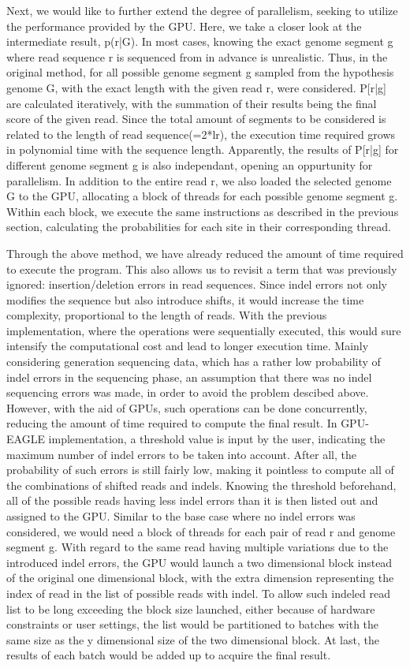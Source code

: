 \documentclass{PHlab-thesis}
\begin{document}
Next, we would like to further extend the degree of parallelism, seeking to utilize the performance provided by the GPU. Here, we take a closer look at the intermediate result, p(r|G). In most cases, knowing the exact genome segment g where read sequence r is sequenced from in advance is unrealistic. Thus, in the original method, for all possible genome segment g sampled from the hypothesis genome G, with the exact length with the given read r, were considered. P[r|g] are calculated iteratively, with the summation of their results being the final score of the given read. Since the total amount of segments to be considered is related to the length of read sequence(=2*lr), the execution time required grows in polynomial time with the sequence length. Apparently, the results of P[r|g] for different genome segment g is also independant, opening an oppurtunity for parallelism. In addition to the entire read r, we also loaded the selected genome G to the GPU, allocating a block of threads for each possible genome segment g. Within each block, we execute the same instructions as described in the previous section, calculating the probabilities for each site in their corresponding thread.

Through the above method, we have already reduced the amount of time required to execute the program. This also allows us to revisit a term that was previously ignored: insertion/deletion errors in read sequences. Since indel errors not only modifies the sequence but also introduce shifts, it would increase the time complexity, proportional to the length of reads. With the previous implementation, where the operations were sequentially executed, this would sure intensify the computational cost and lead to longer execution time. Mainly considering generation sequencing data, which has a rather low probability of indel errors in the sequencing phase, an assumption that there was no indel sequencing errors was made, in order to avoid the problem descibed above. However, with the aid of GPUs, such operations can be done concurrently, reducing the amount of time required to compute the final result. In GPU-EAGLE implementation, a threshold value is input by the user, indicating the maximum number of indel errors to be taken into account. After all, the probability of such errors is still fairly low, making it pointless to compute all of the combinations of shifted reads and indels. Knowing the threshold beforehand, all of the possible reads having less indel errors than it is then listed out and assigned to the GPU. Similar to the base case where no indel errors was considered, we would need a block of threads for each pair of read r and genome segment g. With regard to the same read having multiple variations due to the introduced indel errors, the GPU would launch a two dimensional block instead of the original one dimensional block, with the extra dimension representing the index of read in the list of possible reads with indel. To allow such indeled read list to be long exceeding the block size launched, either because of hardware constraints or user settings, the list would be partitioned to batches with the same size as the y dimensional size of the two dimensional block. At last, the results of each batch would be added up to acquire the final result.
\end{document}
